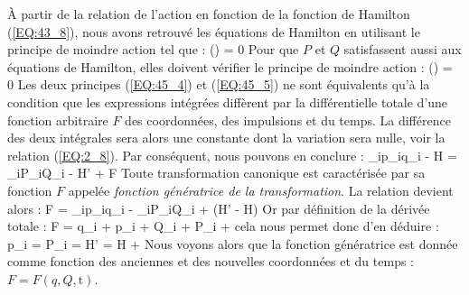 \`{A} partir de la relation de l'action en fonction de la fonction de Hamilton (\ref{EQ:43_8}), nous avons retrouv\'{e} les \'{e}quations de Hamilton en utilisant le principe de moindre action tel que :
\be
	\delta\left(\right) = 0 \label{EQ:45_4}
\ee
Pour que $P$ et $Q$ satisfassent aussi aux \'{e}quations de Hamilton, elles doivent v\'{e}rifier le principe de moindre action :
\be
	\delta\left(\right) = 0 \label{EQ:45_5}
\ee
Les deux principes (\ref{EQ:45_4}) et (\ref{EQ:45_5}) ne sont \'{e}quivalents qu'\`{a} la condition que les expressions int\'{e}gr\'{e}es diff\`{e}rent par la diff\'{e}rentielle totale d'une fonction arbitraire $F$ des coordonn\'{e}es, des impulsions et du temps. La diff\'{e}rence des deux int\'{e}grales sera alors une constante dont la variation sera nulle, voir la relation (\ref{EQ:2_8}). Par cons\'{e}quent, nous pouvons en conclure :
\benn
	\sum_{i}p_{i}q_{i} - H = \sum_{i}P_{i}Q_{i} - H' + F
\eenn
Toute transformation canonique est caract\'{e}ris\'{e}e par sa fonction $F$ appel\'{e}e \emph{fonction g\'{e}n\'{e}ratrice de la transformation}. La relation devient alors :
\be
	F = \sum_{i}p_{i}q_{i} - \sum_{i}P_{i}Q_{i} + (H' - H) \label{EQ:45_6}
\ee
Or par d\'{e}finition de la d\'{e}riv\'{e}e totale :
\benn
	F = q_{i} + p_{i} + Q_{i} + P_{i} + 
\eenn
cela nous permet donc d'en d\'{e}duire :
\be
	p_{i} = \text{, }P_{i} = H' = H +  \label{EQ:45_7}
\ee
Nous voyons alors que la fonction g\'{e}n\'{e}ratrice est donn\'{e}e comme fonction des anciennes et des nouvelles coordonn\'{e}es et du temps : $F = F(q,Q,\mathrm{t})$.

